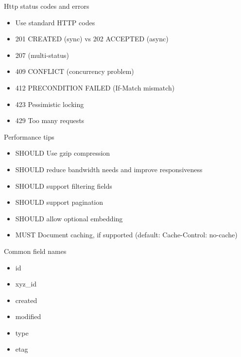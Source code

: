\documentclass[10pt]{beamer}
\begin{document}
\begin{frame}{Http status codes and errors}

  \begin{itemize}

    \item
          Use standard HTTP codes
    \item
          201 CREATED (sync) vs 202 ACCEPTED (async)
    \item
          207 (multi-status)
    \item
          409 CONFLICT (concurrency problem)
    \item
          412 PRECONDITION FAILED (If-Match mismatch)
    \item
          423 Pessimistic locking
    \item
          429 Too many requests
  \end{itemize}

\end{frame}

\begin{frame}{Performance tips}

  \begin{itemize}

    \item
          SHOULD Use gzip compression
    \item
          SHOULD reduce bandwidth needs and improve responsiveness
    \item
          SHOULD support filtering fields
    \item
          SHOULD support pagination
    \item
          SHOULD allow optional embedding
    \item
          MUST Document caching, if supported (default: Cache-Control: no-cache)
  \end{itemize}

\end{frame}

\begin{frame}{Common field names}

  \begin{itemize}

    \item
          id
    \item
          xyz\_id
    \item
          created
    \item
          modified
    \item
          type
    \item
          etag
  \end{itemize}

\end{frame}
\end{document}
